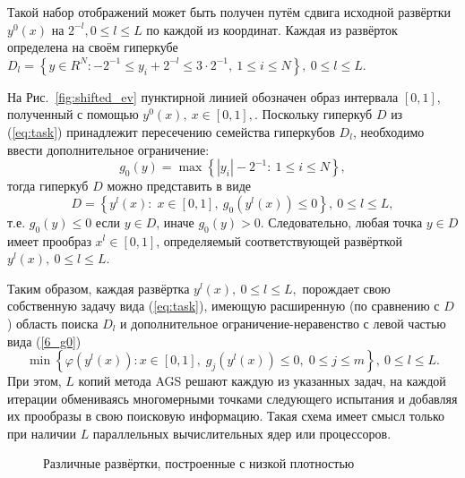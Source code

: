 Такой набор отображений может быть получен путём сдвига исходной развёртки $y^0(x)$ на $2^{-l},0
\leq l \leq L$ по каждой из координат. Каждая из развёрток определена на своём гиперкубе $D_l=
\left\{y \in R^N: -2^{-1} \leq y_i+2^{-l} \leq 3 \cdot 2^{-1},\ 1\leq i\leq N\right\},\ 0 \leq l \leq
L$.

На Рис.~\ref{fig:shifted_ev} пунктирной линией обозначен образ интервала $[0,1]$, полученный с помощью $y^0(x),\
x\in [0,1],$. Поскольку гиперкуб $D$ из (\ref{eq:task}) принадлежит пересечению
семейства гиперкубов $D_l$, необходимо ввести дополнительное ограничение:
\begin{equation}\label{6_g0}
g_0(y)=\max\left\{\left|y_i\right| - 2^{-1}:\ 1\leq i\leq N\right\},
\end{equation}
тогда гиперкуб $D$ можно представить в виде
\[
D=\left\{y^l(x):\; x\in [0,1],\ g_0(y^l(x))\leq 0 \right\},\ 0\leq l \leq L,
\]
т.е. $g_0(y) \leq 0$ если $y\in D$, иначе $g_0(y)>0$. Следовательно, любая точка $y \in D$
имеет прообраз $x^l \in [0,1]$, определяемый соответствующей развёрткой $y^l(x),\ 0\leq l\leq L$.

Таким образом, каждая развёртка $y^l(x),\ 0\leq l \leq L,$ порождает свою собственную задачу вида
(\ref{eq:task}), имеющую расширенную (по сравнению с $D$) область поиска $D_l$
и дополнительное ограничение-неравенство с левой частью вида (\ref{6_g0})
\begin{equation}\label{6_problem_l}
\min{\left\{\varphi(y^l(x)):x\in [0,1], \; g_j(y^l(x))\leq 0, \; 0 \leq j \leq m\right\}}, \ 0 \leq l \leq L.
\end{equation}
При этом, $L$ копий метода AGS решают каждую из указанных задач, на каждой итерации обмениваясь многомерными точками
следующего испытания и добавляя их прообразы в свою поисковую информацию. Такая схема имеет смысл только при
наличии $L$ параллельных вычислительных ядер или процессоров.

\begin{figure}[ht]
    \centering
    \caption{Различные развёртки, построенные с низкой плотностью}
\end{figure}

